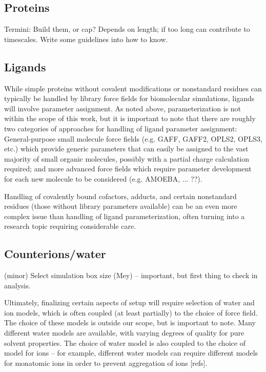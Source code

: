 \documentclass[9pt]{livecoms}
\begin{document}
\subsection{Proteins}

Termini: Build them, or cap? Depends on length; if too long can contribute to timescales. Write some guidelines into how to know. %

\subsection{Ligands}

While simple proteins without covalent modifications or nonstandard residues can typically be handled by library force fields for biomolecular simulations, ligands will involve parameter assignment.
As noted above, parameterization is not within the scope of this work, but it is important to note that there are roughly two categories of approaches for handling of ligand parameter assignment: 
General-purpose small molecule force fields (e.g. GAFF, GAFF2, OPLS2, OPLS3, etc.) %
which provide generic parameters that can easily be assigned to the vast majority of small organic molecules, possibly with a partial charge calculation required; and more advanced force fields which require parameter development for each new molecule to be considered (e.g. AMOEBA, ... ??). 

Handling of covalently bound cofactors, adducts, and certain nonstandard residues (those without library parameters available) can be an even more complex issue than handling of ligand parameterization, often turning into a research topic requiring considerable care. 

\subsection{Counterions/water}
(minor) Select simulation box size (Mey) -- important, but first thing to check in analysis.

Ultimately, finalizing certain aspects of setup will require selection of water and ion models, which is often coupled (at least partially) to the choice of force field.
The choice of these models is outside our scope, but is important to note. 
Many different water models are available, with varying degrees of quality for pure solvent properties.
The choice of water model is also coupled to the choice of model for ions -- for example, different water models can require different models for monatomic ions in order to prevent aggregation of ions [refs].
\end{document}
